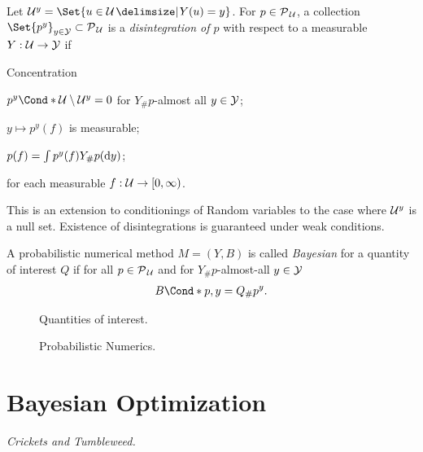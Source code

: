 \begin{definition}[Disintegration]
    Let $\Uc^y = \Set{u \in \Uc \with Y(u) = y}$.
    For $p \in \operatorname{\mathcal{P}\mkern1mu}_{\mathcal{U}}$, a collection $\Set{p^y}_{y \in \Yc} \subset \Probs{\Uc}$ is a \emph{disintegration of $p$} with respect to a measurable $Y: \mathcal{U} \to \mathcal{Y}$ if
    \begin{labeling}{Concentration\quad}
        \item[Concentration] $\Fun*{p^y}{\Uc \setminus \Uc^y} = 0$ for $Y_\#p$-almost all $y \in \mathcal{Y}$;
        \item[Measurability] $y \mapsto p^y(f)$ is measurable;
        \item[Conditioning] $p(f) = \int p^y(f) Y_\#p(\mathop{}\!\mathrm{d} y)$;
    \end{labeling}
    for each measurable $f : \mathcal{U} \to [0, \infty)$.
\end{definition}
This is an extension to conditionings of Random variables to the case where $\mathcal{U}^y$ is a null set.
Existence of disintegrations is guaranteed under weak conditions.

\begin{definition}
    \label{def:bayesian_probabilistic_numerical_method}
    A probabilistic numerical method $M = (Y, B)$ is called \emph{Bayesian} for a quantity of interest $Q$ if for all $p \in \operatorname{\mathcal{P}\mkern1mu}_{\mathcal{U}}$ and for $Y_\#p$-almost-all $y \in \mathcal{Y}$
    \begin{align}
        \Fun*{B}{p, y} = Q_\#p^y.
    \end{align}
\end{definition}


\begin{figure}[t]
    \centering
    
    \caption[Quantities of interest]{
        Quantities of interest.
        \label{fig:quantities_of_interest}
    }
\end{figure}
\begin{figure}[t]
    \centering
    
    \caption[Probabilistic Numerics]{
        Probabilistic Numerics.
        \label{fig:probabilistic_numerics}
    }
\end{figure}


\section{Bayesian Optimization}
\label{sec:bayesian_optimization}
\emph{Crickets and Tumbleweed.}


